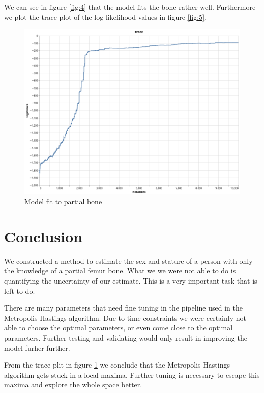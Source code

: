 \documentclass[10pt]{article}
\theoremstyle{definition}
\begin{document}
We can see in figure \ref{fig:4} that the model fits the bone rather well. Furthermore we plot the trace plot of the log likelihood values in figure \ref{fig:5}.
\begin{figure}[h!]
\includegraphics[scale=0.4]{trace8.png}
\centering
\caption{Model fit to partial bone}
\label{fig:6}
\end{figure}
\newpage
\section{Conclusion}

We constructed a method to estimate the sex and stature of a person with only the knowledge of a partial femur bone. What we we were not able to do is quantifying the uncertainty of our estimate. This is a very important task that is left to do.

There are many parameters that need fine tuning in the pipeline used in the Metropolis Hastings algorithm. Due to time constraints we were certainly not able to choose the optimal parameters, or even come close to the optimal parameters. Further testing and validating would only result in improving the model furher further.

\noindent
From the trace plit in figure \ref{fig:6} we conclude that the Metropolis Hastings algorithm gets stuck in a local maxima. Further tuning is necessary to escape this maxima and explore the whole space better.
\end{document}
